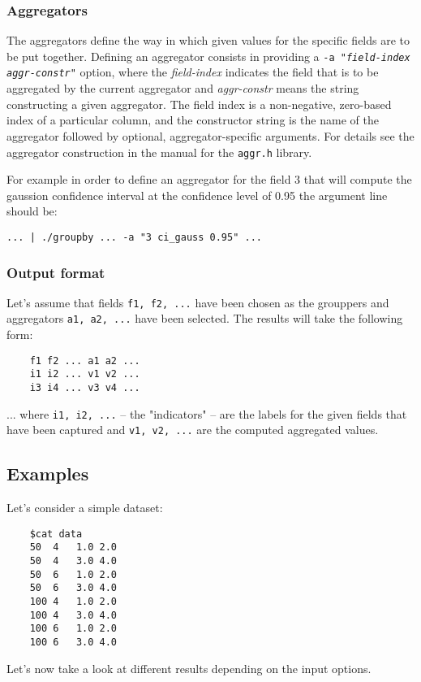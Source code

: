 \documentclass{report}
\begin{document}
	\subsubsection{Aggregators}
	The aggregators define the way in which given values for the specific fields
	are to be put together. Defining an aggregator consists in providing a
	\texttt{-a "\textit{field-index} \textit{aggr-constr}"} option, where the
	\textit{field-index} indicates the field that is to be aggregated by the
	current aggregator and \textit{aggr-constr} means the string constructing
	a given aggregator. The field index is a non-negative, zero-based index
	of a particular column, and the constructor string is the name of the
	aggregator followed by optional, aggregator-specific arguments. For details see
	the aggregator construction in the manual for the \texttt{aggr.h} library.

	For example in order to define an aggregator for the field 3 that will compute
	the gaussion confidence interval at the confidence level of 0.95 the argument
	line should be:

	\texttt{... | ./groupby ... -a "3 ci\_gauss 0.95" ...}

	\subsubsection{Output format}
	Let's assume that fields \texttt{f1, f2, ...} have been chosen as the
	grouppers and aggregators \texttt{a1, a2, ...} have been selected.
	The results will take the following form:
	\begin{verbatim}
	f1 f2 ... a1 a2 ...
	i1 i2 ... v1 v2 ...
	i3 i4 ... v3 v4 ...
	\end{verbatim}

	... where \texttt{i1, i2, ...} -- the "indicators" -- are the labels for
	the given fields that have been captured and \texttt{v1, v2, ...} are
	the computed aggregated values.

	\subsection{Examples}
	Let's consider a simple dataset:
	\begin{verbatim}
	$cat data
	50	4	1.0	2.0
	50	4	3.0	4.0
	50	6	1.0	2.0
	50	6	3.0	4.0
	100	4	1.0	2.0
	100	4	3.0	4.0
	100	6	1.0	2.0
	100	6	3.0	4.0
	\end{verbatim}

	Let's now take a look at different results depending on the input options.
\end{document}
